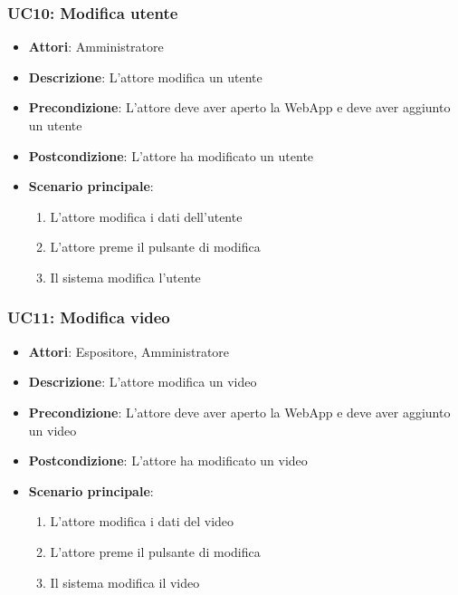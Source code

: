 \subsubsection{UC10: Modifica utente}
\label{subsubsec:uc10}
\begin{itemize}
    \item \textbf{Attori}: Amministratore
    \item \textbf{Descrizione}: L'attore modifica un utente
    \item \textbf{Precondizione}: L'attore deve aver aperto la WebApp e deve aver aggiunto un utente
    \item \textbf{Postcondizione}: L'attore ha modificato un utente
    \item \textbf{Scenario principale}:
    \begin{enumerate}
        \item L'attore modifica i dati dell'utente
        \item L'attore preme il pulsante di modifica
        \item Il sistema modifica l'utente
    \end{enumerate}
\end{itemize}

\subsubsection{UC11: Modifica video}
\label{subsubsec:uc11}
\begin{itemize}
    \item \textbf{Attori}: Espositore, Amministratore
    \item \textbf{Descrizione}: L'attore modifica un video
    \item \textbf{Precondizione}: L'attore deve aver aperto la WebApp e deve aver aggiunto un video
    \item \textbf{Postcondizione}: L'attore ha modificato un video
    \item \textbf{Scenario principale}:
    \begin{enumerate}
        \item L'attore modifica i dati del video
        \item L'attore preme il pulsante di modifica
        \item Il sistema modifica il video
    \end{enumerate}
\end{itemize}

